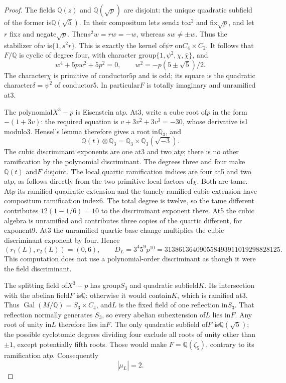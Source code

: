 \begin{proof}
The fields $\mathbb Q(z)$ and $\mathbb Q(\sqrt p)$ are disjoint:
the unique quadratic subfield of the former is$\mathbb Q(\sqrt5)$.
In their compositum let$s$ send$z$ to$z^2$ and fix$\sqrt p$, and
let$r$ fix$z$ and negate$\sqrt p$.  Then$s^2w=rw=-w$, whereas
$sw\ne\pm w$.  Thus the stabilizer of$w$ is$\{1,s^2r\}$.
This is exactly the kernel of$\psi\tau$ on$C_4\times C_2$.
It follows that$F/\mathbb Q$ is cyclic of degree four, with character
group$\{1,\psi^2,\chi,\bar\chi\}$, and
\[
 w^4+5p w^2+5p^2=0,\qquad
 w^2=-p(5\pm\sqrt5)/2.
 \tag{RQC.2}
\]
The character$\chi$ is primitive of conductor$5p$ and is odd;
its square is the quadratic character$\delta=\psi^2$ of conductor5.
In particular$F$ is totally imaginary and unramified at3.

The polynomial$X^3-p$ is Eisenstein at$p$.  At3, write a cube root
of$p$ in the form$-(1+3v)$: the required equation is
$v+3v^2+3v^3=-30$, whose derivative is1 modulo3.
Hensel's lemma therefore gives a root in$\mathbb Q_3$, and
\[
 \mathbb Q(t)\otimes\mathbb Q_3
      =\mathbb Q_3\times\mathbb Q_3(\sqrt{-3}).
\]
The cubic discriminant exponents are one at3 and two at$p$;
there is no other ramification by the polynomial discriminant.
The degrees three and four make$\mathbb Q(t)$ and$F$ disjoint.
The local quartic ramification indices are four at5 and two at$p$,
as follows directly from the two primitive local factors of$\chi$.
Both are tame.  At$p$ its ramified quadratic extension and the
tamely ramified cubic extension have compositum ramification index6.
The total degree is twelve, so the tame different contributes
$12(1-1/6)=10$ to the discriminant exponent there.  At5 the cubic
algebra is unramified and contributes three copies of the quartic
different, for exponent9.  At3 the unramified quartic base change
multiplies the cubic discriminant exponent by four.  Hence
\[
 (r_1(L),r_2(L))=(0,6),\qquad
 D_L=3^4 5^9p^{10}
       =313861364090558493911019298828125.
 \tag{RQC.3}
\]
This computation does not use a polynomial-order discriminant as
though it were the field discriminant.

The splitting field of$X^3-p$ has group$S_3$ and quadratic subfield$K$.
Its intersection with the abelian field$F$ is$\mathbb Q$: otherwise
it would contain$K$, which is ramified at3.  Thus
$\operatorname{Gal}(M/\mathbb Q)=S_3\times C_4$, and$L$ is the fixed
field of one reflection in$S_3$.  That reflection normally generates
$S_3$, so every abelian subextension of$L$ lies in$F$.
Any root of unity in$L$ therefore lies in$F$.
The only quadratic subfield of$F$ is$\mathbb Q(\sqrt5)$; the possible
cyclotomic degrees dividing four exclude all roots of unity other than
$\pm1$, except potentially fifth roots.  Those would make
$F=\mathbb Q(\zeta_5)$, contrary to its ramification at$p$.
Consequently
\[
                         |\mu_L|=2.
 \tag{RQC.4}
\]


\end{proof}
